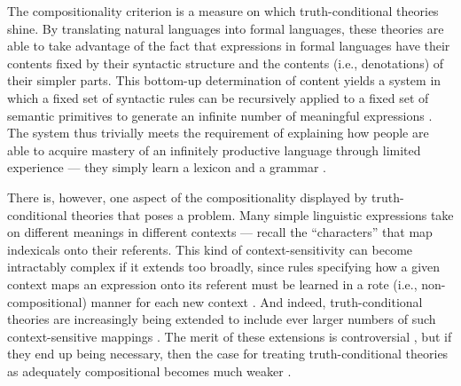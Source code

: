 The compositionality criterion is a measure on which truth-conditional theories shine. By translating natural languages into formal languages, these theories are able to take advantage of the fact that expressions in formal languages have their contents fixed by their syntactic structure and the contents (i.e., denotations) of their simpler parts. This bottom-up determination of content yields a system in which a fixed set of syntactic rules can be recursively applied to a fixed set of semantic primitives to generate an infinite number of meaningful expressions \citep{Szabo:2013}. The system thus trivially meets the requirement of explaining how people are able to acquire mastery of an infinitely productive language through limited experience --- they simply learn a lexicon and a grammar \citep{Pinker:1994}. 

There is, however, one aspect of the compositionality displayed by truth-conditional theories that poses a problem. Many simple linguistic expressions take on different meanings in different contexts --- recall the ``characters'' that map indexicals onto their referents. This kind of context-sensitivity can become intractably complex if it extends too broadly, since rules specifying how a given context maps an expression onto its referent must be learned in a rote (i.e., non-compositional) manner for each new context \citep{Unnsteinsson:2014}. And indeed, truth-conditional theories are increasingly being extended to include ever larger numbers of such context-sensitive mappings \citep{Recanati:2012,Unnsteinsson:2014}. The merit of these extensions is controversial \citep{CappelenLepore:2005}, but if they end up being necessary, then the case for treating truth-conditional theories as adequately compositional becomes much weaker \citep{Unnsteinsson:2014}. 

